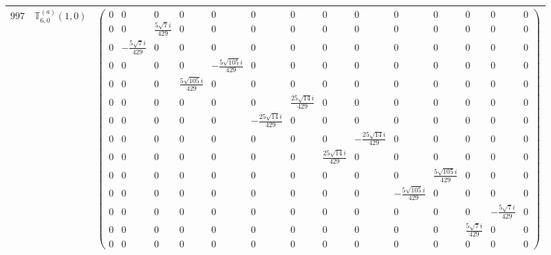 \documentclass[fleqn,8pt,landscape]{jsarticle}
\begin{document}
\begin{center}
\begin{longtable}{ccc}
$ 997 $ & $ \mathbb{T}_{6,0}^{(a)}(1,0) $ & $ \begin{pmatrix} 0 & 0 & 0 & 0 & 0 & 0 & 0 & 0 & 0 & 0 & 0 & 0 & 0 & 0 \\ 0 & 0 & \frac{5 \sqrt{7} i}{429} & 0 & 0 & 0 & 0 & 0 & 0 & 0 & 0 & 0 & 0 & 0 \\ 0 & - \frac{5 \sqrt{7} i}{429} & 0 & 0 & 0 & 0 & 0 & 0 & 0 & 0 & 0 & 0 & 0 & 0 \\ 0 & 0 & 0 & 0 & - \frac{5 \sqrt{105} i}{429} & 0 & 0 & 0 & 0 & 0 & 0 & 0 & 0 & 0 \\ 0 & 0 & 0 & \frac{5 \sqrt{105} i}{429} & 0 & 0 & 0 & 0 & 0 & 0 & 0 & 0 & 0 & 0 \\ 0 & 0 & 0 & 0 & 0 & 0 & \frac{25 \sqrt{14} i}{429} & 0 & 0 & 0 & 0 & 0 & 0 & 0 \\ 0 & 0 & 0 & 0 & 0 & - \frac{25 \sqrt{14} i}{429} & 0 & 0 & 0 & 0 & 0 & 0 & 0 & 0 \\ 0 & 0 & 0 & 0 & 0 & 0 & 0 & 0 & - \frac{25 \sqrt{14} i}{429} & 0 & 0 & 0 & 0 & 0 \\ 0 & 0 & 0 & 0 & 0 & 0 & 0 & \frac{25 \sqrt{14} i}{429} & 0 & 0 & 0 & 0 & 0 & 0 \\ 0 & 0 & 0 & 0 & 0 & 0 & 0 & 0 & 0 & 0 & \frac{5 \sqrt{105} i}{429} & 0 & 0 & 0 \\ 0 & 0 & 0 & 0 & 0 & 0 & 0 & 0 & 0 & - \frac{5 \sqrt{105} i}{429} & 0 & 0 & 0 & 0 \\ 0 & 0 & 0 & 0 & 0 & 0 & 0 & 0 & 0 & 0 & 0 & 0 & - \frac{5 \sqrt{7} i}{429} & 0 \\ 0 & 0 & 0 & 0 & 0 & 0 & 0 & 0 & 0 & 0 & 0 & \frac{5 \sqrt{7} i}{429} & 0 & 0 \\ 0 & 0 & 0 & 0 & 0 & 0 & 0 & 0 & 0 & 0 & 0 & 0 & 0 & 0 \end{pmatrix} $ \\ \hline

\end{longtable}
\end{center}
\end{document}
